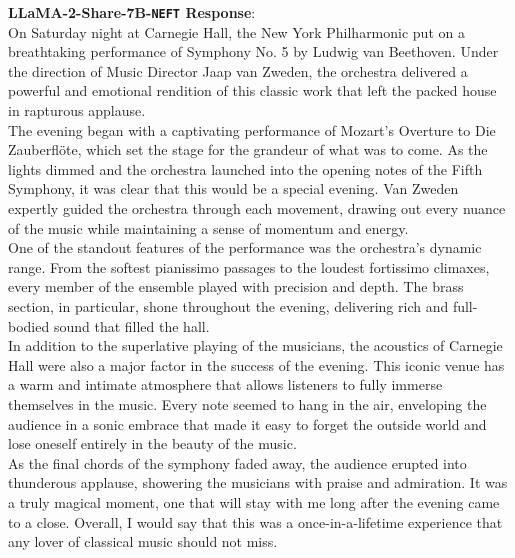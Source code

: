 \documentclass{article} %
\newcommand{\neft}{\texttt{NEFT}}
\newcommand{\llama}{LLaMA}
\begin{document}
\begin{tcolorbox}[breakable,boxrule=0pt]
  \textbf{\llama{}-2-Share-7B-\neft{} Response}: \\On Saturday night at Carnegie Hall, the New York Philharmonic put on a breathtaking performance of Symphony No. 5 by Ludwig van Beethoven. Under the direction of Music Director Jaap van Zweden, the orchestra delivered a powerful and emotional rendition of this classic work that left the packed house in rapturous applause.\\The evening began with a captivating performance of Mozart's Overture to Die Zauberflöte, which set the stage for the grandeur of what was to come. As the lights dimmed and the orchestra launched into the opening notes of the Fifth Symphony, it was clear that this would be a special evening. Van Zweden expertly guided the orchestra through each movement, drawing out every nuance of the music while maintaining a sense of momentum and energy.\\One of the standout features of the performance was the orchestra's dynamic range. From the softest pianissimo passages to the loudest fortissimo climaxes, every member of the ensemble played with precision and depth. The brass section, in particular, shone throughout the evening, delivering rich and full-bodied sound that filled the hall.\\In addition to the superlative playing of the musicians, the acoustics of Carnegie Hall were also a major factor in the success of the evening. This iconic venue has a warm and intimate atmosphere that allows listeners to fully immerse themselves in the music. Every note seemed to hang in the air, enveloping the audience in a sonic embrace that made it easy to forget the outside world and lose oneself entirely in the beauty of the music.\\As the final chords of the symphony faded away, the audience erupted into thunderous applause, showering the musicians with praise and admiration. It was a truly magical moment, one that will stay with me long after the evening came to a close. Overall, I would say that this was a once-in-a-lifetime experience that any lover of classical music should not miss.\\

\end{tcolorbox}
\end{document}
